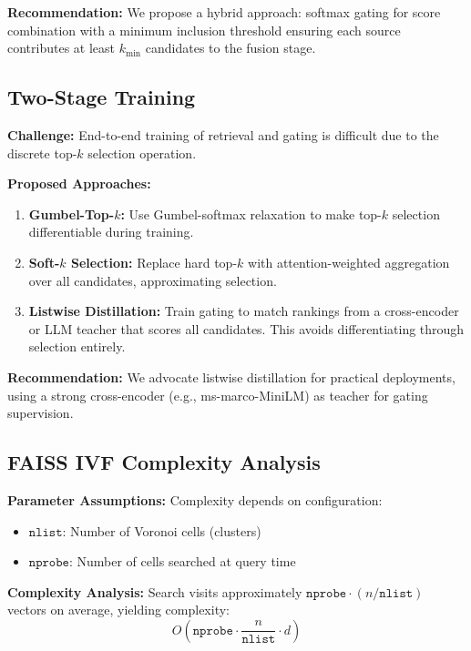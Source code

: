 \documentclass[11pt,a4paper]{article}
\begin{document}
\textbf{Recommendation:} We propose a hybrid approach: softmax gating for score combination with a minimum inclusion threshold ensuring each source contributes at least $k_{\min}$ candidates to the fusion stage.

\subsection{Two-Stage Training}
\label{sec:training}

\textbf{Challenge:} End-to-end training of retrieval and gating is difficult due to the discrete top-$k$ selection operation.

\textbf{Proposed Approaches:}
\begin{enumerate}
    \item \textbf{Gumbel-Top-$k$:} Use Gumbel-softmax relaxation \citep{jang2017categorical} to make top-$k$ selection differentiable during training.
    
    \item \textbf{Soft-$k$ Selection:} Replace hard top-$k$ with attention-weighted aggregation over all candidates, approximating selection.
    
    \item \textbf{Listwise Distillation:} Train gating to match rankings from a cross-encoder or LLM teacher that scores all candidates. This avoids differentiating through selection entirely.
\end{enumerate}

\textbf{Recommendation:} We advocate listwise distillation for practical deployments, using a strong cross-encoder (e.g., ms-marco-MiniLM) as teacher for gating supervision.

\subsection{FAISS IVF Complexity Analysis}
\label{sec:faiss_complexity}

\textbf{Parameter Assumptions:} Complexity depends on configuration:
\begin{itemize}
    \item $\texttt{nlist}$: Number of Voronoi cells (clusters)
    \item $\texttt{nprobe}$: Number of cells searched at query time
\end{itemize}

\textbf{Complexity Analysis:} Search visits approximately $\texttt{nprobe} \cdot (n / \texttt{nlist})$ vectors on average, yielding complexity:
\begin{equation}
O\left(\texttt{nprobe} \cdot \frac{n}{\texttt{nlist}} \cdot d\right)
\end{equation}
\end{document}
